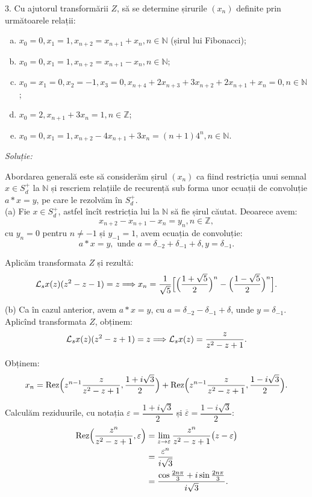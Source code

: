 \vspace{1cm}

3. Cu ajutorul transformării $Z$, să se determine șirurile $(x_n)$ definite 
prin următoarele relații:
\begin{enumerate}[(a)]
\item $x_0 = 0, x_1 = 1, x_{n+2} = x_{n+1} + x_n, n \in \mathbb{N}$ 
  (șirul lui Fibonacci);
\item $x_0 = 0, x_1 = 1, x_{n+2} = x_{n+1} - x_n, n \in \mathbb{N}$;
\item $x_0 = x_1 = 0, x_2 = -1, x_3 = 0, x_{n+4} + 
  2x_{n+3} + 3 x_{n+2} + 2 x_{n+1} + x_n = 0, n \in \mathbb{N}$;
\item $x_0 = 2, x_{n+1} + 3x_n = 1, n \in \mathbb{Z}$;
\item $x_0 = 0, x_1 = 1, x_{n+2} - 4 x_{n+1} + 3x_n 
  = (n+1)4^n, n \in \mathbb{N}$.
\end{enumerate}

\emph{Soluție:}

Abordarea generală este să considerăm șirul $(x_n)$ ca fiind restricția unui 
semnal $x \in S_d^+$ la $\mathbb{N}$ și rescriem relațiile de recurență sub 
forma unor ecuații de convoluție $a \ast x = y$, pe care le rezolvăm în $S_d^+$.\\

(a) Fie $x \in S_d^+$, astfel încît restricția lui la $\mathbb{N}$ să fie șirul 
căutat. Deoarece avem: 
\[
  x_{n+2} - x_{n+1} - x_n = y_n, n \in \mathbb{Z},
\]
cu $y_n = 0$ pentru $n \neq -1$ și $y_{-1} = 1$, avem ecuația de convoluție: 
\[
  a \ast x = y, \text{ unde } a 
  = \delta_{-2} + \delta_{-1} + \delta, y = \delta_{-1}.
\]

Aplicăm transformata $Z$ și rezultă: 
\[
  \mathcal{L}_s x(z) (z^2 - z - 1) = z \Longrightarrow x_n 
  = \dfrac{1}{\sqrt{5}} \Big[ \Big( \dfrac{1 + \sqrt{5}}{2} \Big)^n - 
  \Big( \dfrac{1 - \sqrt{5}}{2} \Big)^n \Big].
\]

(b) Ca în cazul anterior, avem $a \ast x = y$, cu 
$a = \delta_{-2} - \delta_{-1} + \delta$, unde $y = \delta_{-1}$. Aplicînd 
transformata $Z$, obținem: 
\[
  \mathcal{L}_s x(z) (z^2 - z + 1) = z \Longrightarrow \mathcal{L}_s x(z) 
  = \dfrac{z}{z^2 - z + 1}.
\]

Obținem:
\[
  x_n = \mathrm{Rez} \Big( z^{n-1} \dfrac{z}{z^2 - z + 1}, 
  \dfrac{1 + i \sqrt{3}}{2} \Big) + \mathrm{Rez} \Big( z^{n-1} \dfrac{z}{z^2 - z + 1}, 
  \dfrac{1 - i \sqrt{3}}{2} \Big).
\]

Calculăm reziduurile, cu notația $\varepsilon = \dfrac{1 + i \sqrt{3}}{2}$ și 
$\overline{\varepsilon} = \dfrac{1 - i \sqrt{3}}{2}$:
\begin{align*}
  \mathrm{Rez} \Big( \dfrac{z^n}{z^2 - z + 1}, \varepsilon \Big) 
  &= \lim_{z \to \varepsilon} \dfrac{z^n}{z^2 - z + 1} 
    \big( z - \varepsilon \big) \\
  &= \dfrac{\varepsilon^n}{i \sqrt{3}} \\
  &= \dfrac{\cos \frac{2 n \pi}{3} + i \sin \frac{2 n \pi}{3}}{i \sqrt{3}}.
\end{align*}

